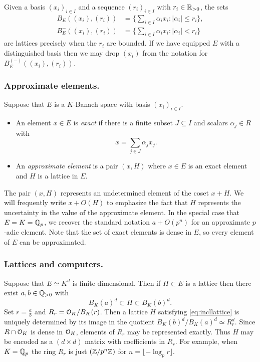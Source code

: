\documentclass{lms}
\begin{document}
Given a basis $(x_i)_{i \in I}$ and a sequence $(r_i)_{i \in I}$ with $r_i \in \mathbb R_{>0}$, the sets
\begin{align*}
B_E((x_i),(r_i)) &= \Big\{ \sum_{i \in I} \alpha_i x_i : \lvert \alpha_i \rvert \le r_i \Big\}, \\
B^-_E((x_i),(r_i)) &= \Big\{ \sum_{i \in I} \alpha_i x_i : \lvert \alpha_i \rvert < r_i \Big\}
\end{align*}
are lattices precisely when the $r_i$ are bounded.  If we have equipped $E$ with a distinguished basis
then we may drop $(x_i)$ from the notation for $B^{(-)}_E((x_i),(r_i))$.

\subsubsection*{Approximate elements.}

Suppose that $E$ is a $K$-Banach space with basis $(x_i)_{i \in I}$.
\begin{deftn}
\label{def:approximate}
\begin{itemize}
\item An element $x \in E$ is \emph{exact} if there is a finite subset $J \subseteq I$ and scalars $\alpha_j \in R$ with
\begin{equation} \label{eq:exact_elt}
x = \sum_{j \in J} \alpha_j x_j.
\end{equation}

\item An \emph{approximate element} is a pair $(x, H)$ where $x \in E$ is an exact element
and $H$ is a lattice in $E$.
\end{itemize}
\end{deftn}

The pair $(x, H)$ represents an undetermined element of the coset
$x + H$.  We will frequently write $x + O(H)$ to emphasize the fact that $H$ represents
the uncertainty in the value of the approximate element.  In the special case that $E = K = \mathbb Q_p$,
we recover the standard notation $a + O(p^n)$ for an approximate $p$-adic element.
Note that the set of exact elements is dense in $E$, so every element of $E$ can be approximated.

\subsubsection*{Lattices and computers.}

Suppose that $E \simeq K^d$ is finite dimensional.  Then if $H \subset E$
is a lattice then there exist $a, b \in \mathbb Q_{>0}$ with
\begin{equation}
\label{eq:incllattice}
B_K(a)^d \subset H \subset B_K(b)^d.
\end{equation}
Set $r = \frac a b$ and $R_r = \OK/B_K(r)$.  
Then a lattice $H$ satisfying \eqref{eq:incllattice} is uniquely 
determined by its image in the quotient $B_K(b)^d / B_K(a)^d \simeq 
R_r^d$.  Since $R \cap \OK$ is dense in $\OK$, elements of $R_r$ may be
represented exactly.  Thus $H$ may be encoded as a 
$(d \times d)$ matrix with coefficients in $R_r$.  For example, when
$K = \mathbb Q_p$ the ring $R_r$ is just $(\mathbb Z / p^n\mathbb Z)$ for $n = \lfloor - \log_p r \rfloor$.
\end{document}
